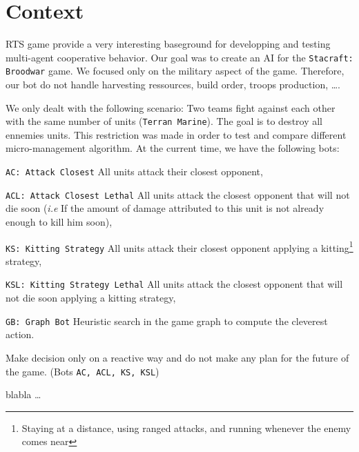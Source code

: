 \section{Context}

RTS game provide a very interesting baseground for developping and testing multi-agent cooperative behavior.
Our goal was to create an AI for the \texttt{Stacraft: Broodwar} game. We focused only on the military aspect of the game. Therefore, our bot do not handle harvesting ressources, build order, troops production, \ldots.

We only dealt with the following scenario: Two teams fight against each other with the same number of units (\texttt{Terran Marine}). The goal is to destroy all ennemies units.
This restriction was made in order to test and compare different micro-management algorithm. 
At the current time, we have the following bots:
\begin{shortitem}
\item \texttt{AC: Attack Closest} All units attack their closest opponent,
\item \texttt{ACL: Attack Closest Lethal} All units attack the closest opponent that will not die soon (\emph{i.e} If the amount of damage attributed to this unit is not already enough to kill him soon),
\item \texttt{KS: Kitting Strategy} All units attack their closest opponent applying a kitting\footnote{Staying at a distance, using ranged attacks, and running whenever the enemy comes near} strategy,
\item \texttt{KSL: Kitting Strategy Lethal} All units attack the closest opponent that will not die soon applying a kitting strategy,
\item \texttt{GB: Graph Bot} Heuristic search in the game graph to compute the cleverest action.
\end{shortitem}

\begin{definition}
Make decision only on a reactive way and do not make any plan for the future of the game. (Bots \texttt{AC, ACL, KS, KSL})
\end{definition}

\begin{definition}
blabla \ldots
\end{definition}
